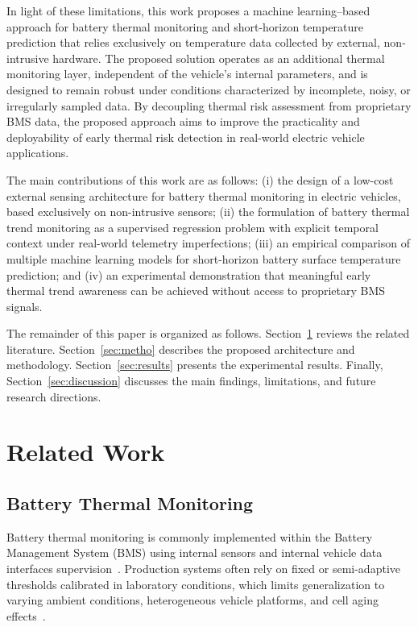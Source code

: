 \documentclass[runningheads]{llncs}
\begin{document}
In light of these limitations, this work proposes a machine learning--based approach for battery thermal monitoring and short-horizon temperature prediction that relies exclusively on temperature data collected by external, non-intrusive hardware. The proposed solution operates as an additional thermal monitoring layer, independent of the vehicle's internal parameters, and is designed to remain robust under conditions characterized by incomplete, noisy, or irregularly sampled data. By decoupling thermal risk assessment from proprietary BMS data, the proposed approach aims to improve the practicality and deployability of early thermal risk detection in real-world electric vehicle applications.

The main contributions of this work are as follows: 
(i) the design of a low-cost external sensing architecture for battery thermal monitoring in electric vehicles, based exclusively on non-intrusive sensors; 
(ii) the formulation of battery thermal trend monitoring as a supervised regression problem with explicit temporal context under real-world telemetry imperfections; 
(iii) an empirical comparison of multiple machine learning models for short-horizon battery surface temperature prediction; and 
(iv) an experimental demonstration that meaningful early thermal trend awareness can be achieved without access to proprietary BMS signals.

The remainder of this paper is organized as follows. Section~\ref{sec:related} reviews the related literature. Section~\ref{sec:metho} describes the proposed architecture and methodology. Section~\ref{sec:results} presents the experimental results. Finally, Section~\ref{sec:discussion} discusses the main findings, limitations, and future research directions.

\section{Related Work}
\label{sec:related}

\subsection{Battery Thermal Monitoring}
Battery thermal monitoring is commonly implemented within the Battery Management System (BMS) using internal sensors and internal vehicle data interfaces supervision~\cite{togun2025comprehensive,yang20196077}. Production systems often rely on fixed or semi-adaptive thresholds calibrated in laboratory conditions, which limits generalization to varying ambient conditions, heterogeneous vehicle platforms, and cell aging effects~\cite{togun2025comprehensive,yang20196077}.
\end{document}
